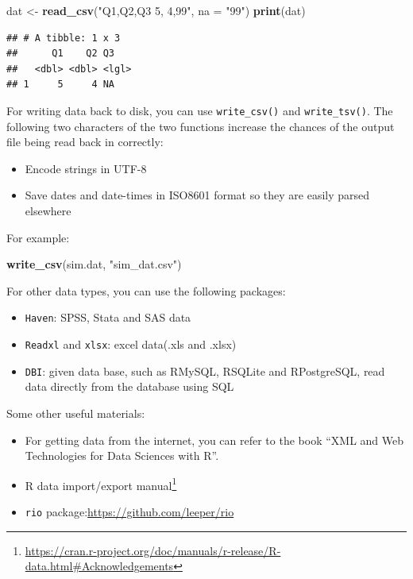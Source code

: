 \documentclass[12pt,]{krantz}
\makeatletter
\newenvironment{Shaded}{\begin{snugshade}}{\end{snugshade}}
\newcommand{\DataTypeTok}[1]{\textcolor[rgb]{0.27,0.27,0.27}{#1}}
\newcommand{\KeywordTok}[1]{\textcolor[rgb]{0.27,0.27,0.27}{\textbf{#1}}}
\newcommand{\NormalTok}[1]{#1}
\newcommand{\StringTok}[1]{\textcolor[rgb]{0.5,0.5,0.5}{#1}}
\providecommand{\tightlist}{%
  \setlength{\itemsep}{0pt}\setlength{\parskip}{0pt}}
\renewcommand{\href}[2]{#2\footnote{\url{#1}}}
\newenvironment{kframe}{%
\medskip{}
\setlength{\fboxsep}{.8em}
 \def\at@end@of@kframe{}%
 \ifinner\ifhmode%
  \def\at@end@of@kframe{\end{minipage}}%
  \begin{minipage}{\columnwidth}%
 \fi\fi%
 \def\FrameCommand##1{\hskip\@totalleftmargin \hskip-\fboxsep
 \colorbox{shadecolor}{##1}\hskip-\fboxsep
     \hskip-\linewidth \hskip-\@totalleftmargin \hskip\columnwidth}%
 \MakeFramed {\advance\hsize-\width
   \@totalleftmargin\z@ \linewidth\hsize
   \@setminipage}}%
 {\par\unskip\endMakeFramed%
 \at@end@of@kframe}
\renewenvironment{Shaded}{\begin{kframe}}{\end{kframe}}
\makeatother
\begin{document}
\begin{Shaded}
\begin{Highlighting}[]
\NormalTok{dat <-}\StringTok{ }\KeywordTok{read_csv}\NormalTok{(}\StringTok{"Q1,Q2,Q3}
\StringTok{               5, 4,99"}\NormalTok{, }
               \DataTypeTok{na =} \StringTok{"99"}\NormalTok{)}
\KeywordTok{print}\NormalTok{(dat)}
\end{Highlighting}
\end{Shaded}

\begin{verbatim}
## # A tibble: 1 x 3
##      Q1    Q2 Q3   
##   <dbl> <dbl> <lgl>
## 1     5     4 NA
\end{verbatim}

For writing data back to disk, you can use \texttt{write\_csv()} and \texttt{write\_tsv()}. The following two characters of the two functions increase the chances of the output file being read back in correctly:

\begin{itemize}
\tightlist
\item
  Encode strings in UTF-8
\item
  Save dates and date-times in ISO8601 format so they are easily parsed elsewhere
\end{itemize}

For example:

\begin{Shaded}
\begin{Highlighting}[]
\KeywordTok{write_csv}\NormalTok{(sim.dat, }\StringTok{"sim_dat.csv"}\NormalTok{)}
\end{Highlighting}
\end{Shaded}

For other data types, you can use the following packages:

\begin{itemize}
\tightlist
\item
  \texttt{Haven}: SPSS, Stata and SAS data
\item
  \texttt{Readxl} and \texttt{xlsx}: excel data(.xls and .xlsx)
\item
  \texttt{DBI}: given data base, such as RMySQL, RSQLite and RPostgreSQL, read data directly from the database using SQL
\end{itemize}

Some other useful materials:

\begin{itemize}
\tightlist
\item
  For getting data from the internet, you can refer to the book ``XML and Web Technologies for Data Sciences with R''.\\
\item
  \href{https://cran.r-project.org/doc/manuals/r-release/R-data.html\#Acknowledgements}{R data import/export manual}
\item
  \texttt{rio} package:\url{https://github.com/leeper/rio}
\end{itemize}
\end{document}
